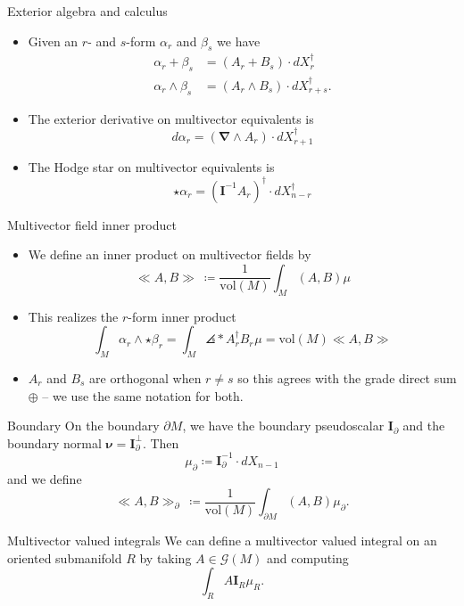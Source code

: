 \documentclass[aspectratio=169,handout]{beamer}
\newcommand{\grad}{\boldsymbol{\nabla}}
\newcommand{\G}{\mathcal{G}}
\newcommand{\blade}[1]{\boldsymbol{#1}}
\newcommand{\multivecinnerproduct}[2]{\ll #1, #2\gg}
\newcommand{\boundary}{{\partial M}}
\newcommand{\pseudoscalar}{\blade{I}}
\DeclarePairedDelimiter\angles{\langle}{\rangle}
\newcommand{\proj}[2]{\angles*{#2}_{#1}}
\begin{document}
\begin{frame}{Exterior algebra and calculus}
\vfill
\begin{itemize}
\item Given an $r$- and $s$-form $\alpha_r$ and $\beta_s$ we have
\begin{align*}
\alpha_r + \beta_s &= (A_r+B_s) \cdot dX_r^\dagger\\
\alpha_r \wedge \beta_s &= (A_r \wedge B_s) \cdot dX_{r+s}^\dagger.
\end{align*}

\item The exterior derivative on multivector equivalents is 
\[
d\alpha_r = (\grad \wedge A_r) \cdot dX_{r+1}^\dagger
\]

\item The Hodge star on multivector equivalents is
\[
\star \alpha_r = (\pseudoscalar^{-1} A_r)^\dagger \cdot dX_{n-r}^\dagger
\]
\end{itemize}
\vfill
\end{frame}

\begin{frame}{Multivector field inner product}
\vfill
\begin{itemize}
\item We define an inner product on multivector fields by 
\[
\multivecinnerproduct{A}{B}~ \coloneqq \frac{1}{\textrm{vol}(M)} \int_M (A,B)\mu
\]
\item This realizes the $r$-form inner product
\[
\int_M \alpha_r \wedge \star \beta_r = \int_M \proj{}{A_r^\dagger B_r}\mu = \textrm{vol}(M)\multivecinnerproduct{A}{B}
\]
\item $A_r$ and $B_s$ are orthogonal when $r\neq s$ so this agrees with the grade direct sum $\oplus$ -- we use the same notation for both.
\end{itemize}
\vfill
\end{frame}

\begin{frame}{Boundary}
\vfill
On the boundary $\partial M$, we have the boundary pseudoscalar $\pseudoscalar_{\partial}$ and the boundary normal $\blade{\nu} = \pseudoscalar_\partial^\perp$. Then
\[
\mu_\partial \coloneqq \pseudoscalar_\partial^{-1} \cdot dX_{n-1}
\] 
and we define 
\[
\multivecinnerproduct{A}{B}_\partial~ \coloneqq \frac{1}{\textrm{vol}(M)}\int_{\boundary} (A,B)\mu_\partial.
\]
\vfill
\end{frame}

\begin{frame}{Multivector valued integrals}
\vfill
We can define a multivector valued integral on an oriented submanifold $R$ by taking $A\in \G(M)$ and computing
\[
\int_R A \pseudoscalar_R \mu_R.
\]
\vfill
\end{frame}
\end{document}
